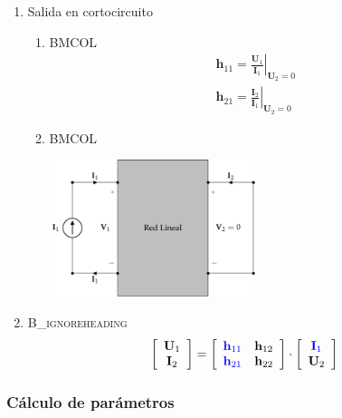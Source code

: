 \begin{enumerate}
\item Salida en cortocircuito
\label{sec:org8fc619b}

\begin{enumerate}
\item \hfill{}\textsc{BMCOL}
\label{sec:orgebc69c6}
\renewcommand{\arraystretch}{2}
\[
  \begin{array}{c}
    \mathbf{h}_{11} = \left.\frac{\mathbf{U}_1}{\mathbf{I}_1}\right\rvert_{\mathbf{U}_2 = 0} \\
    \mathbf{h}_{21} = \left.\frac{\mathbf{I}_2}{\mathbf{I}_1}\right\rvert_{\mathbf{U}_2 = 0}
  \end{array}
\]

\item \hfill{}\textsc{BMCOL}
\label{sec:org3dc9d0b}

\includegraphics[height=4cm]{../figs/parametrosH_entrada.pdf}

\end{enumerate}

\item \hfill{}\textsc{B\_ignoreheading}
\label{sec:org2feac24}
\[
  \left[
    \begin{array}{c}
      \mathbf{U}_1\\
      \mathbf{I}_2
    \end{array}
  \right] =
  \left[
    \begin{array}{cc}
      \color{blue}{\mathbf{h}_{11}} & \mathbf{h}_{12}\\
      \color{blue}{\mathbf{h}_{21}} & \mathbf{h}_{22}
    \end{array}
  \right] \cdot
  \left[
    \begin{array}{c}
      \color{blue}{\mathbf{I}_1}\\
      \mathbf{U}_2
    \end{array}
  \right]
\]
\end{enumerate}

\subsubsection{Cálculo de parámetros}
\label{sec:org16f02aa}

